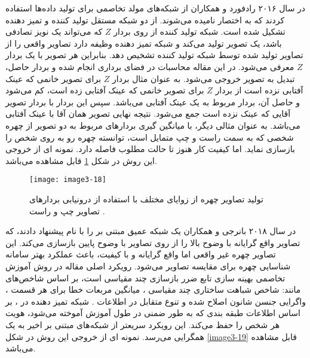 \noindent
در سال ۲۰۱۶ رادفورد و همکاران \cite{radford2016unsupervised} از شبکه‌های مولد تخاصمی برای تولید داده‌ها استفاده کردند که به اختصار  نامیده می‌شوند.  از دو شبکه مستقل تولید کننده و تمیز دهنده تشکیل شده است. شبکه تولید کننده از روی بردار $Z$ که می‌تواند یک نویز تصادفی باشد، یک تصویر تولید می‌کند و شبکه تمیز دهنده وظیفه دارد تصاویر واقعی را از تصاویر تولید شده توسط شبکه تولید کننده تشخیص دهد. بنابراین هر تصویر با یک بردار $Z$ معرفی می‌شود. در این مقاله محاسبات در فضای برداری انجام شده و بردار حاصل، تبدیل به تصویر خروجی می‌شود. به عنوان مثال بردار $Z$ برای تصویر خانمی که عینک آفتابی نزده است از بردار $Z$ برای تصویر خانمی که عینک آفتابی زده است، کم می‌شود و حاصل آن، بردار مربوط به یک عینک آفتابی می‌باشد. سپس این بردار با بردار تصویر آقایی که عینک نزده است جمع می‌شود. نتیجه نهایی تصویر همان آقا با عینک آفتابی می‌باشد. به عنوان مثالی دیگر، با میانگین گیری بردارهای مربوط به دو تصویر از چهره شخصی که به سمت راست و چپ متمایل است، توانسته چهره رو به روی شخص را بازسازی نماید. اما کیفیت کار هنوز تا حالت مطلوب فاصله دارد. نمونه ای از خروجی این روش در شکل \ref{image3-18} قابل مشاهده می‌باشد.

\begin{figure}[h]
\centering
  \texttt{[image: image3-18]}
  \caption{تولید تصاویر چهره از زوایای مختلف با استفاده از درونیابی بردارهای تصاویر چپ و راست \cite{radford2016unsupervised}.}
  \label{image3-18}
\end{figure}

\noindent
در سال ۲۰۱۸ بانرجی و همکاران \cite{BANERJEE2018246} یک شبکه عمیق مبتنی بر  را با نام  پیشنهاد دادند، که تصاویر واقع گرایانه با وضوح بالا را از روی تصاویر با وضوح پایین بازسازی می‌کند. این تصاویر چهره غیر واقعی اما واقع گرایانه و با کیفیت، باعث عملکرد بهتر سامانه شناسایی چهره برای مقایسه تصاویر می‌شود. رویکرد اصلی مقاله در روش آموزش تخاصمی  بهینه سازی تابع ضرر بازسازی چند مقیاسی  است، بر اساس شاخص‌های مانند: شاخص شباهت ساختاری چند مقیاسی  ، میانگین مربعات خطا برای هر قسمت   ، واگرایی جنسن شانون اصلاح شده    و تنوع متقابل در اطلاعات  .  شبکه تمیز دهنده در ، بر اساس اطلاعات طبقه‌ بندی که به طور ضمنی در طول آموزش آموخته می‌شود، هویت هر شخص را حفظ می‌کند. این رویکرد سریعتر از شبکه‌های مبتنی بر  اخیر به یک همگرایی می‌رسد. نمونه ای از خروجی این روش در شکل \ref{image3-19} قابل مشاهده می‌باشد.

